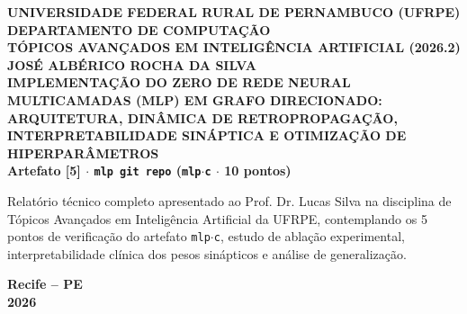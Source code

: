 \documentclass[12pt,a4paper]{article}
\begin{document}
\begin{titlepage}
    \centering
    \textbf{\large UNIVERSIDADE FEDERAL RURAL DE PERNAMBUCO (UFRPE)}\\
    \textbf{\normalsize DEPARTAMENTO DE COMPUTAÇÃO}\\
    \textbf{\normalsize TÓPICOS AVANÇADOS EM INTELIGÊNCIA ARTIFICIAL (2026.2)}\\[3.0cm]

    \textbf{\normalsize JOSÉ ALBÉRICO ROCHA DA SILVA}\\[3.0cm]

    \textbf{\Large IMPLEMENTAÇÃO DO ZERO DE REDE NEURAL MULTICAMADAS (MLP) EM GRAFO DIRECIONADO: ARQUITETURA, DINÂMICA DE RETROPROPAGAÇÃO, INTERPRETABILIDADE SINÁPTICA E OTIMIZAÇÃO DE HIPERPARÂMETROS}\\[1.2cm]
    \textbf{\normalsize Artefato [5] $\cdot$ \texttt{mlp git repo} (\texttt{mlp$\cdot$c} $\cdot$ 10 pontos)}\\[3.0cm]

    \begin{flushright}
        \begin{minipage}{0.65\textwidth}
            \small
            Relatório técnico completo apresentado ao Prof. Dr. Lucas Silva na disciplina de Tópicos Avançados em Inteligência Artificial da UFRPE, contemplando os 5 pontos de verificação do artefato \texttt{mlp$\cdot$c}, estudo de ablação experimental, interpretabilidade clínica dos pesos sinápticos e análise de generalização.
        \end{minipage}
    \end{flushright}

    \vfill
    \textbf{Recife -- PE}\\
    \textbf{2026}
\end{titlepage}

\onehalfspacing
\tableofcontents
\newpage







\newpage


\end{document}
